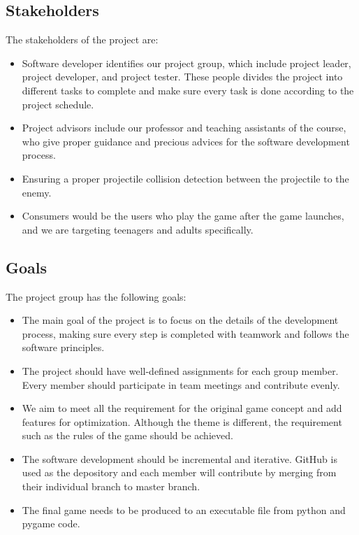 \documentclass{article}
\begin{document}
\subsection{Stakeholders}
The stakeholders of the project are:
\begin{itemize}
    \item Software developer identifies our project group, which include project leader, project developer, and project tester. These people divides the project into different tasks to complete and make sure every task is done according to the project schedule.
    \item Project advisors include our professor and teaching assistants of the course, who give proper guidance and precious advices for the software development process.
    \item Ensuring a proper projectile collision detection between the projectile to the enemy.
    \item Consumers would be the users who play the game after the game launches, and we are targeting teenagers and adults specifically.
\end{itemize}

\subsection{Goals}
The project group has the following goals:
\begin{itemize}
    \item The main goal of the project is to focus on the details of the development process, making sure every step is completed with teamwork and follows the software principles.
    \item The project should have well-defined assignments for each group member. Every member should participate in team meetings and contribute evenly.
    \item We aim to meet all the requirement for the original game concept and add features for optimization. Although the theme is different, the requirement such as the rules of the game should be achieved.
    \item The software development should be incremental and iterative. GitHub is used as the depository and each member will contribute by merging from their individual branch to master branch.
    \item The final game needs to be produced to an executable file from python and pygame code.
\end{itemize}
\end{document}
